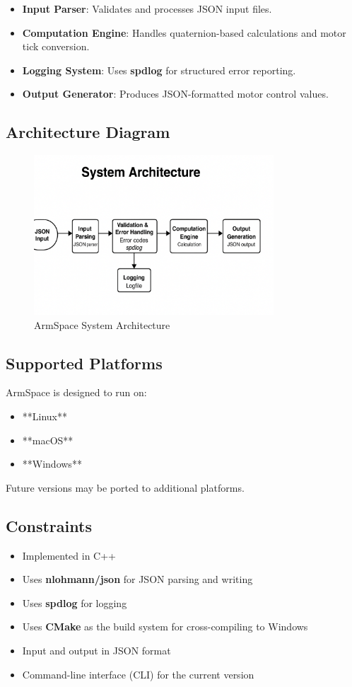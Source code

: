 \documentclass{article}
\begin{document}
\begin{itemize}
    \item \textbf{Input Parser}: Validates and processes JSON input files.
    \item \textbf{Computation Engine}: Handles quaternion-based calculations and motor tick conversion.
    \item \textbf{Logging System}: Uses \textbf{spdlog} for structured error reporting.
    \item \textbf{Output Generator}: Produces JSON-formatted motor control values.
\end{itemize}

\subsection{Architecture Diagram}
\begin{figure}[h]
    \centering
    \includegraphics[width=0.8\textwidth]{architecture_diagram.png}
    \caption{ArmSpace System Architecture}
\end{figure}

\subsection{Supported Platforms}
ArmSpace is designed to run on:
\begin{itemize}
    \item **Linux**
    \item **macOS**
    \item **Windows**
\end{itemize}
Future versions may be ported to additional platforms.

\subsection{Constraints}
\begin{itemize}
    \item Implemented in C++
    \item Uses \textbf{nlohmann/json} for JSON parsing and writing
    \item Uses \textbf{spdlog} for logging
    \item Uses \textbf{CMake} as the build system for cross-compiling to Windows
    \item Input and output in JSON format
    \item Command-line interface (CLI) for the current version
\end{itemize}
\end{document}
